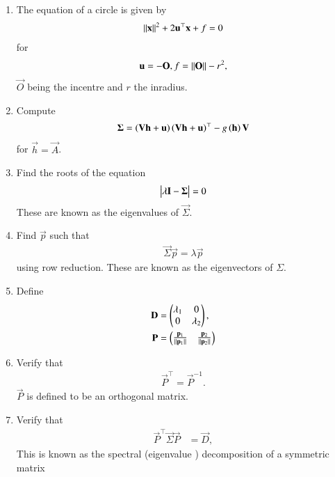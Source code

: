 \begin{enumerate}[label=\thesubsection.\arabic*.,ref=\thesubsection.\theenumi]
\item 
	 The equation of a circle is given by 
	\label{prop:circ-eq}
\begin{align}
	\left\lVert\mathbf{x}\right\rVert^2 + 2 \mathbf{u}^{\top}\mathbf{x} + f = 0
	\label{eq:circ-eq}
\end{align}
for
		\begin{align}
			 \label{eq:conic_quad_form-params}
	 \mathbf{u}=-\mathbf{O}, f = \left\lVert\mathbf{O}\right\rVert-r^2,
		\end{align}
		$\vec{O}$ being the incentre and $r$ the inradius.  
\item Compute 
\begin{align}
	\label{eq:incircle-disc-Sigma}
\mathbf{\Sigma} = 
\left(\mathbf{V}\mathbf{h}+\mathbf{u}\right)
	  \left(\mathbf{V}\mathbf{h}+\mathbf{u}\right)^{\top}
   -
	  {g}\left(\mathbf{h}\right)\mathbf{V}
\end{align}
for $\vec{h}=\vec{A}$.
\item Find the roots of the equation
\begin{align}
	\begin{vmatrix}\lambda \mathbf{I}-\mathbf{\Sigma}\end{vmatrix} = 0
\end{align}
These are known as the eigenvalues of $\vec{\Sigma}$.
\item Find $\vec{p}$  such that 
\begin{align}
	\vec{\Sigma}\vec{p}
	=\lambda\vec{p}
\end{align}
using row reduction.  These are known as the eigenvectors of $\Sigma$.
\item Define
    \begin{align}
      \label{eq:conic_parmas_eig_def-D}
      \mathbf{D} &= \begin{pmatrix}\lambda_1 & 0\\ 0 & \lambda_2\end{pmatrix}, 
      \\
	    \mathbf{P} &= \begin{pmatrix}\frac{\mathbf{p}_1}{\left\lVert\mathbf{p}_1\right\rVert} & \frac{\mathbf{p}_2}{\left\lVert\mathbf{p}_2\right\rVert}\end{pmatrix}
      \label{eq:eigevecP}
    \end{align}
    \item Verify that
  \begin{align}
\vec{P}^{\top}=\vec{P}^{-1}.
  \label{eq:orth-mat}
  \end{align}
  $\vec{P}$ is defined to be an orthogonal matrix.
\item Verify that
    \begin{align}
      \label{eq:conic_parmas_eig_def}
      \vec{P}^{\top}\vec{\Sigma}\vec{P} &= \vec{D},
    \end{align} 
		This is known as the spectral (eigenvalue ) decomposition of a symmetric matrix 


\end{enumerate}
